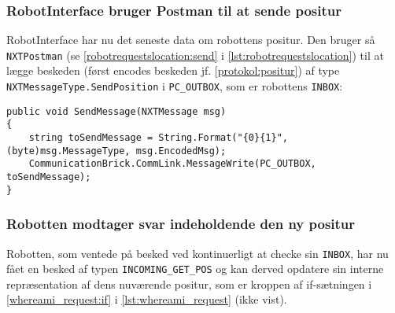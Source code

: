 \subsubsection{RobotInterface bruger Postman til at sende positur}
RobotInterface har nu det seneste data om robottens positur.
Den bruger så \lstinline[style=csharp]!NXTPostman! (se \cref{robotrequestslocation:send} i \cref{lst:robotrequestslocation}) til at lægge beskeden (først encodes beskeden jf. \cref{protokol:positur}) af type \lstinline[style=csharp]!NXTMessageType.SendPosition! i \lstinline[style=csharp]!PC_OUTBOX!, som er robottens \lstinline[style=c]!INBOX!:

\begin{lstlisting}[style=csharpsmall,label=lst:sendmessage,caption=SendMessage i NXTPostman.]
public void SendMessage(NXTMessage msg)
{
    string toSendMessage = String.Format("{0}{1}", (byte)msg.MessageType, msg.EncodedMsg);
    CommunicationBrick.CommLink.MessageWrite(PC_OUTBOX, toSendMessage);
}
\end{lstlisting}

\subsubsection{Robotten modtager svar indeholdende den ny positur}
Robotten, som ventede på besked ved kontinuerligt at checke sin \lstinline[style=c]!INBOX!, har nu fået en besked af typen \lstinline[style=c]!INCOMING_GET_POS! og kan derved opdatere sin interne repræsentation af dens nuværende positur, som er kroppen af if-sætningen i \cref{whereami_request:if} i \cref{lst:whereami_request} (ikke vist).
